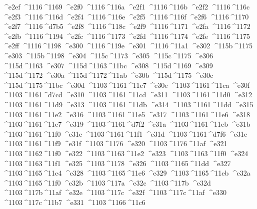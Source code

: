 \checkit ^^^^e2ef ^^^^1116^^^^1169
\checkit ^^^^e2f0 ^^^^1116^^^^116a
\checkit ^^^^e2f1 ^^^^1116^^^^116b
\checkit ^^^^e2f2 ^^^^1116^^^^116c
\checkit ^^^^e2f3 ^^^^1116^^^^116d
\checkit ^^^^e2f4 ^^^^1116^^^^116e
\checkit ^^^^e2f5 ^^^^1116^^^^116f
\checkit ^^^^e2f6 ^^^^1116^^^^1170
\checkit ^^^^e2f7 ^^^^1116^^^^d7b5
\checkit ^^^^e2f8 ^^^^1116^^^^118c
\checkit ^^^^e2f9 ^^^^1116^^^^1171
\checkit ^^^^e2fa ^^^^1116^^^^1172
\checkit ^^^^e2fb ^^^^1116^^^^1194
\checkit ^^^^e2fc ^^^^1116^^^^1173
\checkit ^^^^e2fd ^^^^1116^^^^1174
\checkit ^^^^e2fe ^^^^1116^^^^1175
\checkit ^^^^e2ff ^^^^1116^^^^1198
\checkit ^^^^e300 ^^^^1116^^^^119e
\checkit ^^^^e301 ^^^^1116^^^^11a1
\checkit ^^^^e302 ^^^^115b^^^^1175
\checkit ^^^^e303 ^^^^115b^^^^1198
\checkit ^^^^e304 ^^^^115c^^^^1173
\checkit ^^^^e305 ^^^^115c^^^^1175
\checkit ^^^^e306 ^^^^115d^^^^1163
\checkit ^^^^e307 ^^^^115d^^^^1163^^^^11bc
\checkit ^^^^e308 ^^^^115d^^^^1169
\checkit ^^^^e309 ^^^^115d^^^^1172
\checkit ^^^^e30a ^^^^115d^^^^1172^^^^11ab
\checkit ^^^^e30b ^^^^115d^^^^1175
\checkit ^^^^e30c ^^^^115d^^^^1175^^^^11bc
\checkit ^^^^e30d ^^^^1103^^^^1161^^^^11c7
\checkit ^^^^e30e ^^^^1103^^^^1161^^^^11ca
\checkit ^^^^e30f ^^^^1103^^^^1161^^^^d7cd
\checkit ^^^^e310 ^^^^1103^^^^1161^^^^11cd
\checkit ^^^^e311 ^^^^1103^^^^1161^^^^11d0
\checkit ^^^^e312 ^^^^1103^^^^1161^^^^11d9
\checkit ^^^^e313 ^^^^1103^^^^1161^^^^11db
\checkit ^^^^e314 ^^^^1103^^^^1161^^^^11dd
\checkit ^^^^e315 ^^^^1103^^^^1161^^^^11e2
\checkit ^^^^e316 ^^^^1103^^^^1161^^^^11e5
\checkit ^^^^e317 ^^^^1103^^^^1161^^^^11e6
\checkit ^^^^e318 ^^^^1103^^^^1161^^^^11e7
\checkit ^^^^e319 ^^^^1103^^^^1161^^^^d7f2
\checkit ^^^^e31a ^^^^1103^^^^1161^^^^11eb
\checkit ^^^^e31b ^^^^1103^^^^1161^^^^11f0
\checkit ^^^^e31c ^^^^1103^^^^1161^^^^11f1
\checkit ^^^^e31d ^^^^1103^^^^1161^^^^d7f6
\checkit ^^^^e31e ^^^^1103^^^^1161^^^^11f9
\checkit ^^^^e31f ^^^^1103^^^^1176
\checkit ^^^^e320 ^^^^1103^^^^1176^^^^11af
\checkit ^^^^e321 ^^^^1103^^^^1162^^^^11f0
\checkit ^^^^e322 ^^^^1103^^^^1163^^^^11e2
\checkit ^^^^e323 ^^^^1103^^^^1163^^^^11f0
\checkit ^^^^e324 ^^^^1103^^^^1163^^^^11f1
\checkit ^^^^e325 ^^^^1103^^^^1178
\checkit ^^^^e326 ^^^^1103^^^^1165^^^^11dd
\checkit ^^^^e327 ^^^^1103^^^^1165^^^^11e4
\checkit ^^^^e328 ^^^^1103^^^^1165^^^^11e6
\checkit ^^^^e329 ^^^^1103^^^^1165^^^^11eb
\checkit ^^^^e32a ^^^^1103^^^^1165^^^^11f0
\checkit ^^^^e32b ^^^^1103^^^^117a
\checkit ^^^^e32c ^^^^1103^^^^117b
\checkit ^^^^e32d ^^^^1103^^^^117b^^^^11af
\checkit ^^^^e32e ^^^^1103^^^^117c
\checkit ^^^^e32f ^^^^1103^^^^117c^^^^11af
\checkit ^^^^e330 ^^^^1103^^^^117c^^^^11b7
\checkit ^^^^e331 ^^^^1103^^^^1166^^^^11c6

